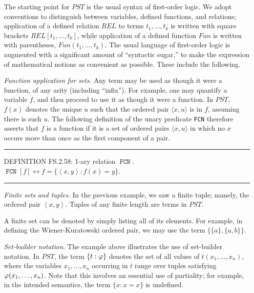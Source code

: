 \documentclass{llncs}
\newcommand{\myrule}{\noindent \rule{\textwidth}{0.3mm}}
\newcommand{\na}[1]{\mathit{#1}}    \newcommand{\fn}[1]{\mathit{#1}}    \newcommand{\ax}[1]{\mathit{(#1)}}  \newcommand{\mdl}[1]{\mathcal{#1}}
\newcommand{\lip}{\langle}
\newcommand{\rip}{\rangle}
\newcommand{\seq}[1]{\left\langle #1 \right\rangle}
\begin{document}
The starting point for $\na{PST}$ is the usual syntax of first-order
logic. We adopt conventions to distinguish between variables, defined
functions, and relations; application of a defined relation $\fn{REL}$
to terms $t_1,\ldots,t_k$ is written with square brackets
$\fn{REL}[t_1,\ldots,t_k]$, while application of a defined function
$\fn{Fun}$ is written with parentheses,
$\fn{Fun}(t_1,\ldots,t_k)$. The usual language of first-order logic is
augmented with a significant amount of ``syntactic sugar,'' to make
the expression of mathematical notions as convenient as
possible. These include the following.

\bigskip

\noindent \emph{Function application for sets.} Any term may be used
as though it were a function, of any arity (including ``infix''). For
example, one may quantify a variable $f$, and then proceed to use it
as though it were a function. In $\na{PST}$, $f(x)$ denotes the unique
$u$ such that the ordered pair $\lip x, u \rip$ is in $f$,
assuming there is such $u$. The following definition of the unary
predicate {\tt FCN} therefore asserts that $f$ is a function if it is
a set of ordered pairs $\lip x, u \rip$ in which no $x$ occurs
more than once as the first component of a pair.

\medskip

\myrule

\noindent DEFINITION FS.2.58: 1-ary relation $\mathop{\mathtt{FCN}}$.
$\mathop{\mathtt{FCN}}[f] \leftrightarrow f = \lbrace \seq{x,y} : f(x) = y
\rbrace $.

\myrule

\bigskip

\noindent \emph{Finite sets and tuples.} In the previous example, we saw a finite tuple; namely, the ordered pair $\seq{x,y}$. Tuples of any finite length are terms in $\na{PST}$.

A finite set can be denoted by simply listing all of its elements. For example, in defining the Wiener-Kuratowski ordered pair, we may use the term $\{\{a\},\{a,b\}\}$.

\bigskip

\noindent \emph{Set-builder notation.} The example above illustrates
the use of set-builder notation. In $\na{PST}$, the term $\{t:\varphi\}$
denotes the set of all values of $t(x_1,\ldots,x_n)$, where the
variables $x_1, \ldots, x_n$ occurring in $t$ range over tuples
satisfying $\varphi(x_1,\ldots,x_n)$. Note that this involves an essential
use of partiality; for example, in the intended semantics, the term
$\{ x : x = x \}$ is undefined.
\end{document}
